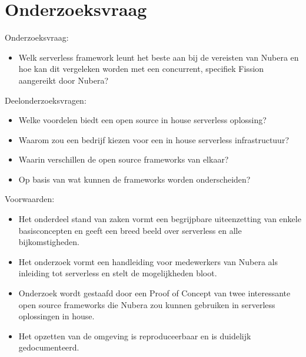 \section{Onderzoeksvraag}
\label{sec:onderzoeksvraag}


Onderzoeksvraag: 
\begin{itemize}
    \item Welk serverless framework leunt het beste aan bij de vereisten van Nubera en hoe kan dit vergeleken worden met een concurrent, specifiek Fission aangereikt door Nubera?
\end{itemize}

Deelonderzoeksvragen: 
\begin{itemize}
    \item Welke voordelen biedt een open source in house serverless oplossing?
    \item Waarom zou een bedrijf kiezen voor een in house serverless infrastructuur?
    \item Waarin verschillen de open source frameworks van elkaar?
    \item Op basis van wat kunnen de frameworks worden onderscheiden? 
\end{itemize}

Voorwaarden: 
\begin{itemize}
    \item Het onderdeel stand van zaken vormt een begrijpbare uiteenzetting van enkele basisconcepten en geeft een breed beeld over serverless en alle bijkomstigheden.
    \item Het onderzoek vormt een handleiding voor medewerkers van Nubera als inleiding tot serverless en stelt de mogelijkheden bloot.
    \item Onderzoek wordt gestaafd door een Proof of Concept van twee interessante open source frameworks die Nubera zou kunnen gebruiken in serverless oplossingen in house.
    \item Het opzetten van de omgeving is reproduceerbaar en is duidelijk gedocumenteerd.
\end{itemize}



